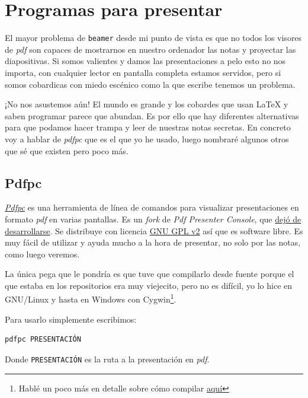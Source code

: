 \section{Programas para presentar}

El mayor problema de \lstinline!beamer! desde mi punto de vista es que
no todos los visores de \emph{pdf} son capaces de mostrarnos en nuestro
ordenador las notas y proyectar las diapositivas. Si somos valientes y
damos las presentaciones a pelo esto no nos importa, con cualquier
lector en pantalla completa estamos servidos, pero si somos cobardicas
con miedo escénico como la que escribe tenemos un problema.

¡No nos asustemos aún! El mundo es grande y los cobardes que usan LaTeX
y saben programar parece que abundan. Es por ello que hay diferentes
alternativas para que podamos hacer trampa y leer de nuestras notas
secretas. En concreto voy a hablar de \emph{pdfpc} que es el que yo he
usado, luego nombraré algunos otros que sé que existen pero poco más.

\subsection{Pdfpc}

\href{https://pdfpc.github.io/}{\emph{Pdfpc}} es una herramienta de
línea de comandos para visualizar presentaciones en formato \emph{pdf}
en varias pantallas. Es un \emph{fork} de \emph{Pdf Presenter Console},
que \href{https://github.com/jakobwesthoff/Pdf-Presenter-Console}{dejó
de desarrollarse}. Se distribuye con licencia
\href{https://github.com/pdfpc/pdfpc/blob/master/LICENSE.txt}{GNU GPL
v2} así que es software libre. Es muy fácil de utilizar y ayuda mucho a
la hora de presentar, no solo por las notas, como luego veremos.

La única pega que le pondría es que tuve que compilarlo desde fuente
porque el que estaba en los repositorios era muy viejecito, pero no es
difícil, yo lo hice en GNU/Linux y hasta en Windows con Cygwin\footnote{Hablé
  un poco más en detalle sobre cómo compilar
  \href{https://ondahostil.wordpress.com/2016/10/24/lo-que-he-aprendido-compilar-pdf-presenter-console-con-cygwin/}{aquí}}.

Para usarlo simplemente escribimos:

\begin{lstlisting}[language={[latex]tex}]
pdfpc PRESENTACIÓN
\end{lstlisting}

Donde \lstinline!PRESENTACIÓN! es la ruta a la presentación en
\emph{pdf}.

